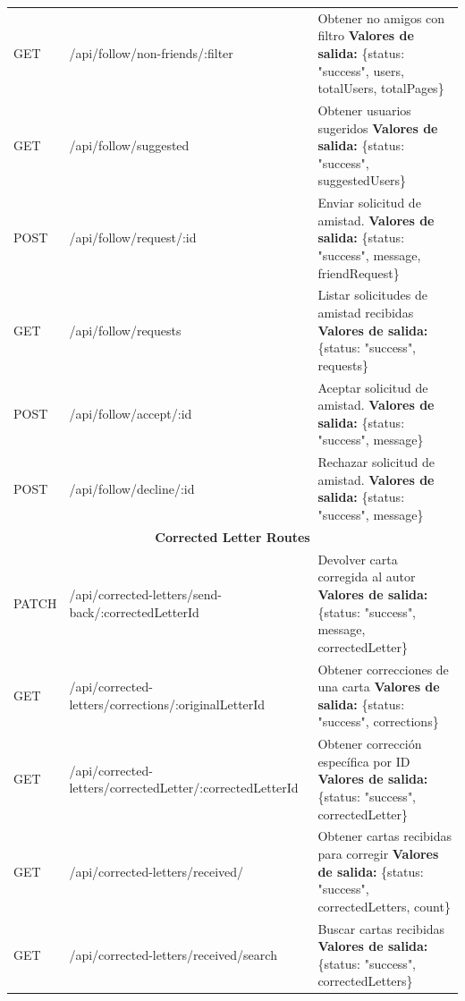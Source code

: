 \begin{longtable}{|l|p{5cm}|p{8cm}|}
GET & /api/follow/non-friends/:filter & Obtener no amigos con filtro \newline \textbf{Valores de salida:} \{status: "success", users, totalUsers, totalPages\} \\
GET & /api/follow/suggested & Obtener usuarios sugeridos \newline \textbf{Valores de salida:} \{status: "success", suggestedUsers\} \\
POST & /api/follow/request/:id & Enviar solicitud de amistad. \newline \textbf{Valores de salida:} \{status: "success", message, friendRequest\} \\
GET & /api/follow/requests & Listar solicitudes de amistad recibidas \newline \textbf{Valores de salida:} \{status: "success", requests\} \\
POST & /api/follow/accept/:id & Aceptar solicitud de amistad. \newline \textbf{Valores de salida:} \{status: "success", message\} \\
POST & /api/follow/decline/:id & Rechazar solicitud de amistad. \newline \textbf{Valores de salida:} \{status: "success", message\} \\
\hline
\hline
\multicolumn{3}{|c|}{\textbf{Corrected Letter Routes}} \\
\hline
PATCH & /api/corrected-letters/send-back/:corrected\-Letter\-Id & Devolver carta corregida al autor \newline \textbf{Valores de salida:} \{status: "success", message, correctedLetter\} \\
GET & /api/corrected-letters/corrections/:original\-Letter\-Id & Obtener correcciones de una carta \newline \textbf{Valores de salida:} \{status: "success", corrections\} \\
GET & /api/corrected-letters/corrected\-Letter/:corrected\-Letter\-Id & Obtener corrección específica por ID \newline \textbf{Valores de salida:} \{status: "success", correctedLetter\} \\
GET & /api/corrected-letters/received/ & Obtener cartas recibidas para corregir \newline \textbf{Valores de salida:} \{status: "success", correctedLetters, count\} \\
GET & /api/corrected-letters/received/search & Buscar cartas recibidas \newline \textbf{Valores de salida:} \{status: "success", correctedLetters\} \\

\end{longtable}
